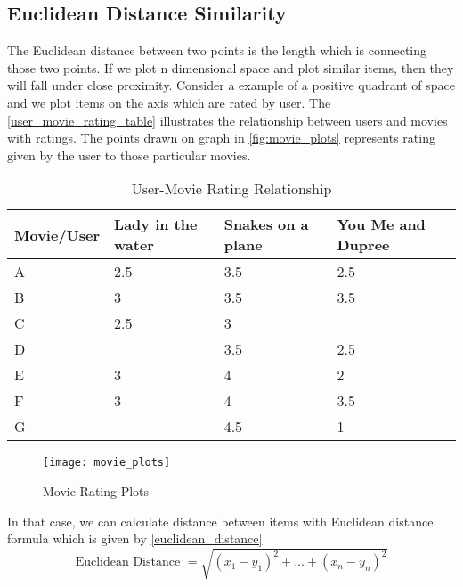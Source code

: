 \subsection{Euclidean Distance Similarity}
\label{euclidean_distance}
The Euclidean distance between two points is the length which is connecting those two points. If we plot n dimensional space and plot similar items, then they will fall under close proximity. Consider a example of a positive quadrant of space and we plot items on the axis which are rated by user. The \autoref{user_movie_rating_table} illustrates the relationship between users and movies with ratings. The points drawn on graph in \autoref{fig:movie_plots} represents rating given by the user to those particular movies.

\begin{table}[]
\centering
\begin{tabular}{|l|l|l|l|}
\hline
Movie/User & Lady in the water & Snakes on a plane & You Me and Dupree \\ \hline
A          & 2.5               & 3.5               & 2.5               \\ \hline
B          & 3                 & 3.5               & 3.5               \\ \hline
C          & 2.5               & 3                 &                   \\ \hline
D          &                   & 3.5               & 2.5               \\ \hline
E          & 3                 & 4                 & 2                 \\ \hline
F          & 3                 & 4                 & 3.5               \\ \hline
G          &                   & 4.5               & 1                 \\ \hline
\end{tabular}
\caption{User-Movie Rating Relationship \cite{11}}
\label{user_movie_rating_table}
\end{table}

\begin{figure}[H]
	\centering
	\texttt{[image: movie\_plots]}
	\caption{Movie Rating Plots \cite{11} } 
	\label{fig:movie_plots}
\end{figure}

\noindent In that case, we can calculate distance between items with Euclidean distance formula which is given by \autoref{euclidean_distance}
\\
\begin{equation}
\textrm{Euclidean Distance } = \sqrt{(x_1 - y_1)^2 + ... + (x_n - y_n)^2}
\label{euclidean_distance}
\end{equation}

